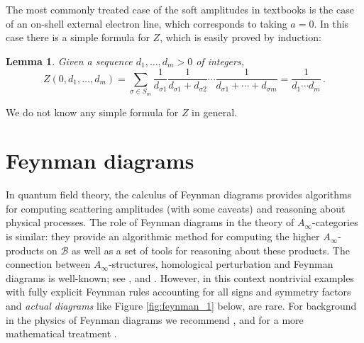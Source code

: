 \documentclass[english,letter paper,12pt,leqno]{article}
\newtheorem{lemma}[theorem]{Lemma}
\theoremstyle{example}
\numberwithin{equation}{section}
\def\BB{\mathcal{B}}
\def\be{\begin{equation}}
\def\ee{\end{equation}}
\begin{document}
The most commonly treated case of the soft amplitudes in textbooks is the case of an on-shell external electron line, which corresponds to taking $a = 0$. In this case there is a simple formula for $Z$, which is easily proved by induction:

\begin{lemma} Given a sequence $d_1,\ldots,d_m > 0$ of integers,
\be
Z(0,d_1,\ldots,d_m) = \sum_{\sigma \in S_m} \frac{1}{d_{\sigma 1}} \frac{1}{d_{\sigma 1} + d_{\sigma 2}} \cdots \frac{1}{d_{\sigma 1} + \cdots + d_{\sigma m}} = \frac{1}{d_1 \cdots d_m}\,.
\ee
\end{lemma}

We do not know any simple formula for $Z$ in general. 

\section{Feynman diagrams}\label{section:feynman_diagram}

In quantum field theory, the calculus of Feynman diagrams provides algorithms for computing scattering amplitudes (with some caveats) and reasoning about physical processes. The role of Feynman diagrams in the theory of $A_\infty$-categories is similar: they provide an algorithmic method for computing the higher $A_\infty$-products on $\BB$ as well as a set of tools for reasoning about these products. The connection between $A_\infty$-structures, homological perturbation and Feynman diagrams is well-known; see \cite{lazaroiu_sft,lazaroiu_roiban}, \cite[p.42]{lazaroiu} and \cite[\S 2.5]{gwilliam}. However, in this context nontrivial examples with fully explicit Feynman rules accounting for all signs and symmetry factors and \emph{actual diagrams} like Figure \ref{fig:feynman_1} below, are rare. For background in the physics of Feynman diagrams we recommend \cite[Ch. 6]{weinberg}, \cite[\S 4.4]{ps} and for a more mathematical treatment \cite{qftstring}. %
\end{document}
